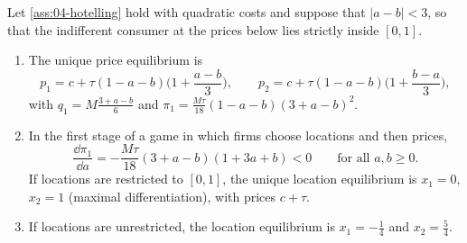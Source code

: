 \begin{proposition}\label{prop:04-hotelling}
Let \cref{ass:04-hotelling} hold with quadratic costs and suppose that $|a - b| < 3$, so that the indifferent
consumer at the prices below lies strictly inside $[0,1]$.
\begin{enumerate}[label=(\roman*)]
\item The unique price equilibrium is
\begin{equation}\label{eq:04-hotelling-quad-prices}
p_1 = c + \tau(1 - a - b)\Big(1 + \frac{a - b}{3}\Big), \qquad p_2 = c + \tau(1 - a - b)\Big(1 + \frac{b - a}{3}\Big),
\end{equation}
with $q_1 = M\frac{3 + a - b}{6}$ and $\pi_1 = \frac{M\tau}{18}(1 - a - b)(3 + a - b)^2$.
\item In the first stage of a game in which firms choose locations and then prices,
\begin{equation}\label{eq:04-hotelling-location}
\frac{\dd\pi_1}{\dd a} = -\frac{M\tau}{18}(3 + a - b)(1 + 3a + b) < 0 \qquad\text{for all } a, b \ge 0 .
\end{equation}
If locations are restricted to $[0,1]$, the unique location equilibrium is $x_1 = 0$, $x_2 = 1$ (maximal
differentiation), with prices $c + \tau$.
\item If locations are unrestricted, the location equilibrium is $x_1 = -\frac{1}{4}$ and $x_2 = \frac{5}{4}$.
\end{enumerate}
\end{proposition}

